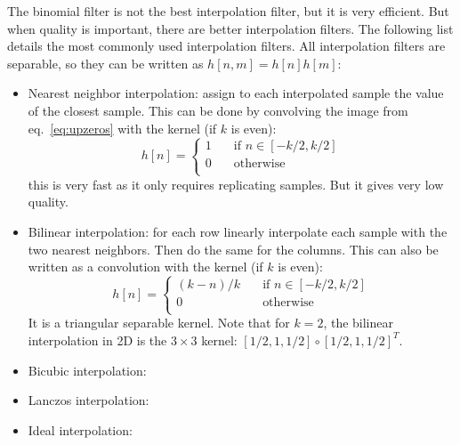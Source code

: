The binomial filter is not the best interpolation filter, but it is very efficient. But when quality is important, there are better interpolation filters.  The following list details the most commonly used interpolation filters. All interpolation filters are separable, so they can be written as $h\left[n,m\right] = h\left[n\right] h\left[m\right]$:
\begin{itemize}
  \item Nearest neighbor interpolation: assign to each interpolated sample the value of the closest sample. This can be done by convolving the image from eq.~\ref{eq:upzeros} with the kernel (if $k$ is even):
        \begin{equation}
          h  \left[n\right] =  \begin{cases}
            1 & \quad \text{if }  n \in  \left[-k/2, k/2\right] \\
            0 & \quad \text{otherwise }                         \\
          \end{cases}
        \end{equation}
        this is very fast as it only requires replicating samples. But it gives very low quality.

  \item Bilinear interpolation: for each row linearly interpolate each sample with the two nearest neighbors. Then do the same for the columns. This can also be written as a convolution with the kernel (if $k$ is even):
        \begin{equation}
          h  \left[n\right] =  \begin{cases}
            (k-n)/k & \quad \text{if }  n \in \left[-k/2, k/2\right] \\
            0       & \quad \text{otherwise }                        \\
          \end{cases}
        \end{equation}
        It is a triangular separable kernel. Note that for $k=2$, the bilinear interpolation in 2D is the $3 \times 3$ kernel: $\left[1/2,1,1/2\right] \circ \left[1/2,1,1/2\right]^T$.

  \item Bicubic interpolation:

  \item Lanczos interpolation:

  \item Ideal interpolation:

\end{itemize}

